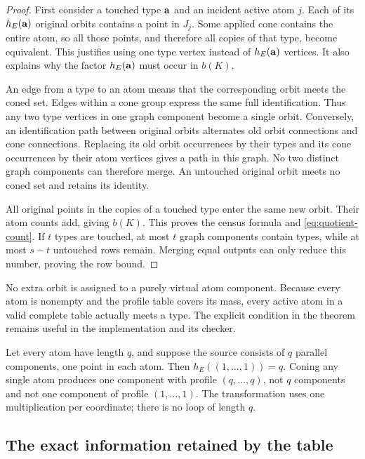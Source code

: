 \begin{proof}
First consider a touched type $\mathbf a$ and an incident active atom $j$.
Each of its $h_E(\mathbf a)$ original orbits contains a point in $J_j$.
Some applied cone contains the entire atom, so all those points, and
therefore all copies of that type, become equivalent. This justifies using
one type vertex instead of $h_E(\mathbf a)$ vertices. It also explains why
the factor $h_E(\mathbf a)$ must occur in $b(K)$.

An edge from a type to an atom means that the corresponding orbit meets the
coned set. Edges within a cone group express the same full identification.
Thus any two type vertices in one graph component become a single orbit.
Conversely, an identification path between original orbits alternates old
orbit connections and cone connections. Replacing its old orbit occurrences
by their types and its cone occurrences by their atom vertices gives a path
in this graph. No two distinct graph components can therefore merge. An
untouched original orbit meets no coned set and retains its identity.

All original points in the copies of a touched type enter the same new
orbit. Their atom counts add, giving $b(K)$. This proves the census formula
and \eqref{eq:quotient-count}. If $t$ types are touched, at most $t$ graph
components contain types, while at most $s-t$ untouched rows remain. Merging
equal outputs can only reduce this number, proving the row bound.
\end{proof}

No extra orbit is assigned to a purely virtual atom component. Because every
atom is nonempty and the profile table covers its mass, every active atom
in a valid complete table actually meets a type. The explicit condition in
the theorem remains useful in the implementation and its checker.

\begin{example}
Let every atom have length $q$, and suppose the source consists of $q$
parallel components, one point in each atom. Then
$h_E((1,\ldots,1))=q$. Coning any single atom produces one component with
profile $(q,\ldots,q)$, not $q$ components and not one component of profile
$(1,\ldots,1)$. The transformation uses one multiplication per coordinate;
there is no loop of length $q$.
\end{example}

\subsection{The exact information retained by the table}


